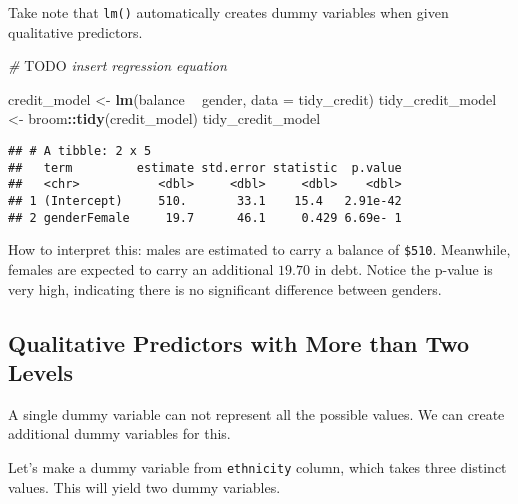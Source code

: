 \documentclass[]{book}
\newenvironment{Shaded}{\begin{snugshade}}{\end{snugshade}}
\newcommand{\AlertTok}[1]{\textcolor[rgb]{0.94,0.16,0.16}{#1}}
\newcommand{\CommentTok}[1]{\textcolor[rgb]{0.56,0.35,0.01}{\textit{#1}}}
\newcommand{\DataTypeTok}[1]{\textcolor[rgb]{0.13,0.29,0.53}{#1}}
\newcommand{\KeywordTok}[1]{\textcolor[rgb]{0.13,0.29,0.53}{\textbf{#1}}}
\newcommand{\NormalTok}[1]{#1}
\newcommand{\OperatorTok}[1]{\textcolor[rgb]{0.81,0.36,0.00}{\textbf{#1}}}
\newcommand{\StringTok}[1]{\textcolor[rgb]{0.31,0.60,0.02}{#1}}
\begin{document}
Take note that \texttt{lm()} automatically creates dummy variables when given qualitative predictors.

\begin{Shaded}
\begin{Highlighting}[]
\CommentTok{# }\AlertTok{TODO}\CommentTok{ insert regression equation}
\end{Highlighting}
\end{Shaded}

\begin{Shaded}
\begin{Highlighting}[]
\NormalTok{credit_model <-}\StringTok{ }\KeywordTok{lm}\NormalTok{(balance }\OperatorTok{~}\StringTok{ }\NormalTok{gender, }\DataTypeTok{data =}\NormalTok{ tidy_credit)}
\NormalTok{tidy_credit_model <-}\StringTok{ }\NormalTok{broom}\OperatorTok{::}\KeywordTok{tidy}\NormalTok{(credit_model)}
\NormalTok{tidy_credit_model}
\end{Highlighting}
\end{Shaded}

\begin{verbatim}
## # A tibble: 2 x 5
##   term         estimate std.error statistic  p.value
##   <chr>           <dbl>     <dbl>     <dbl>    <dbl>
## 1 (Intercept)     510.       33.1    15.4   2.91e-42
## 2 genderFemale     19.7      46.1     0.429 6.69e- 1
\end{verbatim}

How to interpret this: males are estimated to carry a balance of \texttt{\$510}. Meanwhile, females are expected to carry an additional \(19.70\) in debt. Notice the p-value is very high, indicating there is no significant difference between genders.

\hypertarget{qualitative-predictors-with-more-than-two-levels}{%
\subsection{Qualitative Predictors with More than Two Levels}\label{qualitative-predictors-with-more-than-two-levels}}

A single dummy variable can not represent all the possible values. We can create additional dummy variables for this.

Let's make a dummy variable from \texttt{ethnicity} column, which takes three distinct values. This will yield two dummy variables.

\begin{Shaded}
\end{Shaded}
\end{document}
